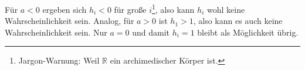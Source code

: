 \documentclass[a4paper,11pt,notitlepage,fullpage]{article}
\newcommand{\R}{\mathbb R}
\begin{document}
\begin{enumerate}
Für $a < 0$ ergeben sich $h_i < 0$ für große $i$\footnote{Jargon-Warnung: Weil $\R$ ein archimedischer Körper ist.}, also kann $h_i$ wohl keine Wahrscheinlichkeit sein. Analog, für $a > 0$ ist $h_1 > 1$, also kann es auch keine Wahrscheinlichkeit sein. Nur $a = 0$ und damit $h_i = 1$ bleibt als Möglichkeit übrig.

\end{enumerate}
\end{document}
